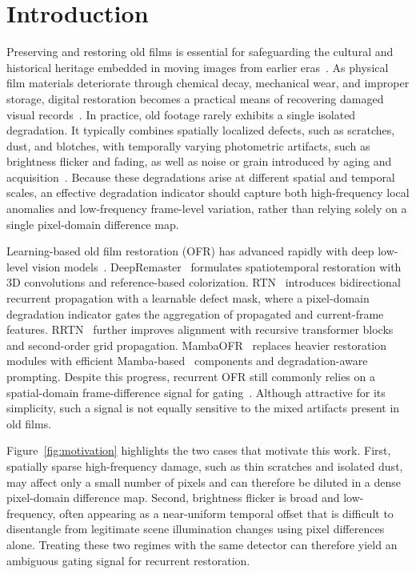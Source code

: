 \section{Introduction}\label{sec:introduction}

Preserving and restoring old films is essential for safeguarding the cultural and historical heritage embedded in moving images from earlier eras~\cite{kokaram1998motion}. As physical film materials deteriorate through chemical decay, mechanical wear, and improper storage, digital restoration becomes a practical means of recovering damaged visual records~\cite{iizuka2019deepremaster}. In practice, old footage rarely exhibits a single isolated degradation. It typically combines spatially localized defects, such as scratches, dust, and blotches, with temporally varying photometric artifacts, such as brightness flicker and fading, as well as noise or grain introduced by aging and acquisition~\cite{rtn2022,wan2020bringing}. Because these degradations arise at different spatial and temporal scales, an effective degradation indicator should capture both high-frequency local anomalies and low-frequency frame-level variation, rather than relying solely on a single pixel-domain difference map.

Learning-based old film restoration (OFR) has advanced rapidly with deep low-level vision models~\cite{su2022survey,tian2020deep_denoising}. DeepRemaster~\cite{iizuka2019deepremaster} formulates spatiotemporal restoration with 3D convolutions and reference-based colorization. RTN~\cite{rtn2022} introduces bidirectional recurrent propagation with a learnable defect mask, where a pixel-domain degradation indicator gates the aggregation of propagated and current-frame features. RRTN~\cite{rrtn2024} further improves alignment with recursive transformer blocks and second-order grid propagation. MambaOFR~\cite{mao2025mambaofr} replaces heavier restoration modules with efficient Mamba-based~\cite{guo2024mambair} components and degradation-aware prompting. Despite this progress, recurrent OFR still commonly relies on a spatial-domain frame-difference signal for gating~\cite{rtn2022}. Although attractive for its simplicity, such a signal is not equally sensitive to the mixed artifacts present in old films.

Figure~\ref{fig:motivation} highlights the two cases that motivate this work. First, spatially sparse high-frequency damage, such as thin scratches and isolated dust, may affect only a small number of pixels and can therefore be diluted in a dense pixel-domain difference map. Second, brightness flicker is broad and low-frequency, often appearing as a near-uniform temporal offset that is difficult to disentangle from legitimate scene illumination changes using pixel differences alone. Treating these two regimes with the same detector can therefore yield an ambiguous gating signal for recurrent restoration.

